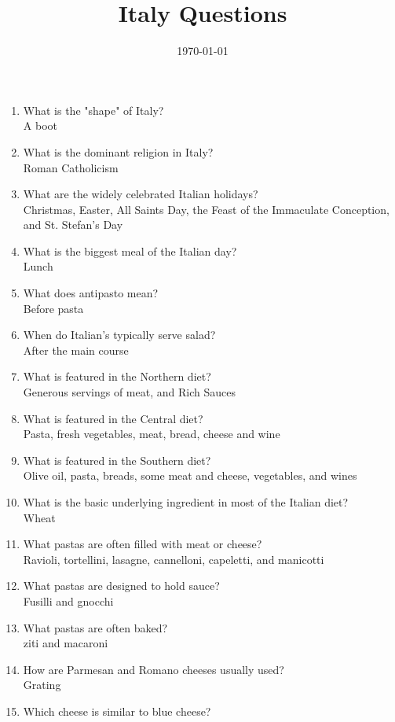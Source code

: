 \documentclass[11pt]{article}
\date{\today}
\title{Italy Questions}
\begin{document}
\maketitle
\tableofcontents

\begin{enumerate}
\item What is the "shape" of Italy?\\
A boot
\item What is the dominant religion in Italy?\\
Roman Catholicism
\item What are the widely celebrated Italian holidays?\\
Christmas, Easter, All Saints Day, the Feast of the Immaculate Conception, and St. Stefan's Day
\item What is the biggest meal of the Italian day?\\
Lunch
\item What does antipasto mean?\\
Before pasta
\item When do Italian's typically serve salad?\\
After the main course
\item What is featured in the Northern diet?\\
Generous servings of meat, and Rich Sauces
\item What is featured in the Central diet?\\
Pasta, fresh vegetables, meat, bread, cheese and wine
\item What is featured in the Southern diet?\\
Olive oil, pasta, breads, some meat and cheese, vegetables, and wines
\item What is the basic underlying ingredient in most of the Italian diet?\\
Wheat
\item What pastas are often filled with meat or cheese?\\
Ravioli, tortellini, lasagne, cannelloni, capeletti, and manicotti
\item What pastas are designed to hold sauce?\\
Fusilli and gnocchi
\item What pastas are often baked?\\
ziti and macaroni
\item How are Parmesan and Romano cheeses usually used?\\
Grating
\item Which cheese is similar to blue cheese?\\

\end{enumerate}
\end{document}

